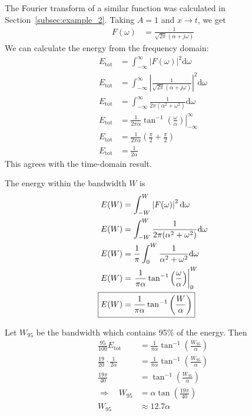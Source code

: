 \documentclass[twocolumn]{myarticle}
\renewcommand{\d}{\mathrm{d}}
\begin{document}
The Fourier transform of a similar function was calculated in Section~\ref{subsec:example_2}.
Taking $ A = 1 $ and $ x \to t $, we get
\begin{align}
    F(\omega) &= \frac{1}{\sqrt{2 \pi}(\alpha + j \omega)}
\end{align}
We can calculate the energy from the frequency domain:
\begin{align}
    E_\text{tot} &= \int_{-\infty}^{\infty} \left| F(\omega) \right|^2 \d \omega
    \\
    E_\text{tot} &= \int_{-\infty}^{\infty} \left| \frac{1}{\sqrt{2 \pi}(\alpha + j \omega)} \right|^2 \d \omega
    \\
    E_\text{tot} &= \int_{-\infty}^{\infty} \frac{1}{2 \pi (\alpha^2 + \omega^2)} \d \omega
    \\
    E_\text{tot} &= \left. \frac{1}{2 \pi \alpha} \tan^{-1} \left( \frac{\omega}{\alpha} \right) \right|_{-\infty}^{\infty}
    \\
    E_\text{tot} &= \frac{1}{2 \pi \alpha} \left( \frac{\pi}{2} + \frac{\pi}{2} \right)
    \\
    E_\text{tot} &= \frac{1}{2 \alpha}
\end{align}
This agrees with the time-domain result.

The energy within the bandwidth $ W $ is
\begin{align}
    E(W) &= \int_{-W}^W \left| F(\omega) \right|^2 \d \omega
    \\
    E(W) &= \int_{-W}^W \frac{1}{2 \pi (\alpha^2 + \omega^2)} \d \omega
    \\
    E(W) &= \frac{1}{\pi} \int_{0}^W \frac{1}{\alpha^2 + \omega^2} \d \omega
    \\
    E(W) &= \left. \frac{1}{\pi \alpha} \tan^{-1} \left( \frac{\omega}{\alpha} \right) \right|_{0}^{W}
    \\
    \Aboxed{E(W) &= \frac{1}{\pi \alpha} \tan^{-1} \left( \frac{W}{\alpha} \right)}
\end{align}

Let $ W_{95} $ be the bandwidth which contains 95\% of the energy.
Then
\begin{align}
    \frac{95}{100} E_\text{tot} &= \frac{1}{\pi \alpha} \tan^{-1} \left( \frac{W_{95}}{\alpha} \right)
    \\
    \frac{19}{20} \cdot \frac{1}{2 \alpha} &= \frac{1}{\pi \alpha} \tan^{-1} \left( \frac{W_{95}}{\alpha} \right)
    \\
    \frac{19 \pi}{40} &= \tan^{-1} \left( \frac{W_{95}}{\alpha} \right)
    \\
    \Longrightarrow \quad W_{95} &= \alpha \tan \left( \frac{19 \pi}{40} \right)
    \\
    W_{95} &\approx 12.7 \alpha
\end{align}
\end{document}
